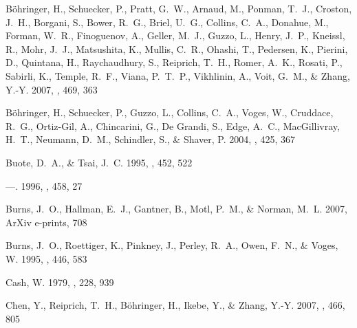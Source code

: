\documentclass[12pt,preprint]{aastex}
\begin{document}
\begin{thebibliography}{}
{B{\"o}hringer}, H., {Schuecker}, P., {Pratt}, G.~W., {Arnaud}, M.,
  {Ponman}, T.~J., {Croston}, J.~H., {Borgani}, S., {Bower}, R.~G.,
  {Briel}, U.~G., {Collins}, C.~A., {Donahue}, M., {Forman}, W.~R.,
  {Finoguenov}, A., {Geller}, M.~J., {Guzzo}, L., {Henry}, J.~P.,
  {Kneissl}, R., {Mohr}, J.~J., {Matsushita}, K., {Mullis}, C.~R.,
  {Ohashi}, T., {Pedersen}, K., {Pierini}, D., {Quintana}, H.,
  {Raychaudhury}, S., {Reiprich}, T.~H., {Romer}, A.~K., {Rosati}, P.,
  {Sabirli}, K., {Temple}, R.~F., {Viana}, P.~T.~P., {Vikhlinin}, A.,
  {Voit}, G.~M., \& {Zhang}, Y.-Y. 2007, \aap, 469, 363

{B{\"o}hringer}, H., {Schuecker}, P., {Guzzo}, L., {Collins}, C.~A., {Voges},
  W., {Cruddace}, R.~G., {Ortiz-Gil}, A., {Chincarini}, G., {De Grandi}, S.,
  {Edge}, A.~C., {MacGillivray}, H.~T., {Neumann}, D.~M., {Schindler}, S., \&
  {Shaver}, P. 2004, \aap, 425, 367

{Buote}, D.~A., \& {Tsai}, J.~C. 1995, \apj, 452, 522

---. 1996, \apj, 458, 27

{Burns}, J.~O., {Hallman}, E.~J., {Gantner}, B., {Motl}, P.~M., \& {Norman},
  M.~L. 2007, ArXiv e-prints, 708

{Burns}, J.~O., {Roettiger}, K., {Pinkney}, J., {Perley}, R.~A., {Owen}, F.~N.,
  \& {Voges}, W. 1995, \apj, 446, 583

{Cash}, W. 1979, \apj, 228, 939

{Chen}, Y., {Reiprich}, T.~H., {B{\"o}hringer}, H., {Ikebe}, Y., \& {Zhang},
  Y.-Y. 2007, \aap, 466, 805


\end{thebibliography}
\end{document}
